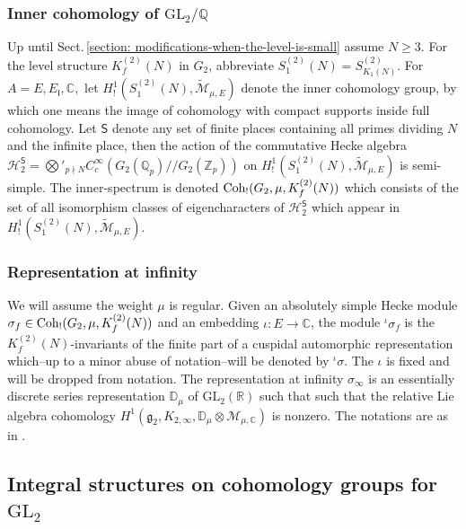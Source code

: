 \documentclass[11pt]{amsart}
\newcommand{\R}{\mathbb R}
\newcommand{\Q}{\mathbb Q}
\newcommand{\C}{\mathbb C}
\newcommand{\GL}{\mathrm{GL}}
\newcommand{\congf}[1]{K_f^{(2)}(#1)}
\begin{document}
 
\subsubsection{Inner cohomology of $\GL_2/\mathbb{Q}$}
\label{sec:inner-coh-gl2} Up until Sect.\,\ref{section: modifications-when-the-level-is-small} assume $N\geq 3$.
For the  level structure $\congf{N}$ in $G_2$, abbreviate $S^{(2)}_1(N) = S^{(2)}_{K_1(N)} $. 
For $A= E, E_\mathfrak{l}, \mathbb{C},$ let $H_!^{1}(S_1^{(2)}(N), \widetilde{\mathcal{M}}_{\mu,E})$ denote the inner cohomology group, 
by which one means the image of cohomology with compact supports inside full cohomology.  
Let $\mathsf{S}$ denote any set of finite places containing all primes dividing $N$ and the infinite place, then the action of the commutative 
Hecke algebra 
$\mathcal{H}_2^{\mathsf{S}} = \bigotimes'_{p \nmid N} C^\infty_c(G_2(\mathbb{Q}_p)/\!\!/G_2(\mathbb{Z}_p))$ on 
$H_!^1(S_1^{(2)}(N), \widetilde{\mathcal{M}}_{\mu,E})$ is semi-simple. 
The inner-spectrum is denoted $\textup{Coh}_!(G_2, \mu, \congf{N})$ which consists of the 
set of all isomorphism classes of eigencharacters of $\mathcal{H}_2^{\mathsf{S}}$ which appear in 
$H_!^{1}(S_1^{(2)}(N), \widetilde{\mathcal{M}}_{\mu,E}).$ 


\subsubsection{Representation at infinity}
\label{sec:rep-infty}
We will assume the weight $\mu$ is regular. Given an absolutely simple Hecke module $\sigma_f \in \textup{Coh}_!(G_2, \mu, \congf{N})$ and an embedding 
$\iota : E \to \C$, the module ${}^\iota\sigma_f$ is the $\congf{N}$-invariants of the finite part of a cuspidal automorphic representation which--up to a minor 
abuse of notation--will be denoted by ${}^\iota\sigma$. The $\iota$ is fixed and will be dropped from notation. 
The representation at infinity ${}\sigma_\infty$ is an essentially discrete 
series representation $\mathbb{D}_{\mu}$ of $\GL_2(\R)$ such that 
such that the relative Lie algebra cohomology 
$H^{1}(\mathfrak{g}_2, K_{2, \infty}, \mathbb{D}_{\mu} \otimes \mathcal{M}_{\mu, \mathbb{C}})$ is nonzero. The notations are as in \cite[Sect.\,3.1]{harder-raghuram}.



\medskip
\subsection{Integral structures on cohomology groups for $\GL_2$}
\end{document}
